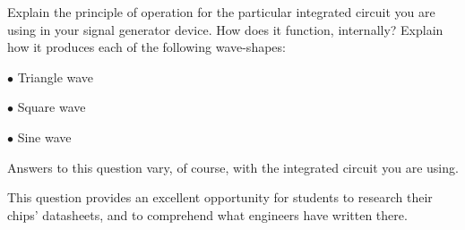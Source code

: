 

Explain the principle of operation for the particular integrated circuit you are using in your signal generator device.  How does it function, internally?  Explain how it produces each of the following wave-shapes:

\medskip
\item{$\bullet$} Triangle wave
\item{$\bullet$} Square wave
\item{$\bullet$} Sine wave
\medskip







Answers to this question vary, of course, with the integrated circuit you are using.







This question provides an excellent opportunity for students to research their chips' datasheets, and to comprehend what engineers have written there.



